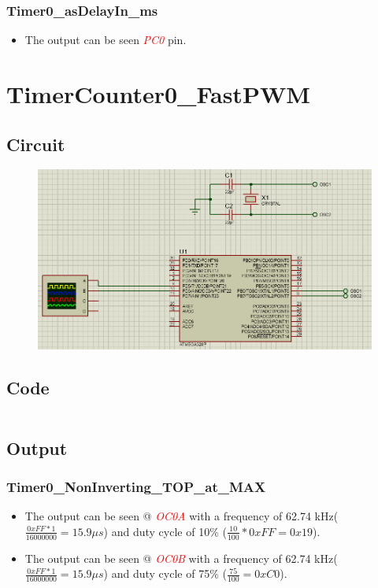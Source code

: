 \documentclass[oneside]{book}
\newcommand{\pinFormat}[1]{\emph{\textcolor{red}{#1}}}
\begin{document}
\subsubsection{Timer0\_asDelayIn\_ms}
\begin{itemize}
    \item The output can be seen \pinFormat{PC0} pin.
\end{itemize}


\section{TimerCounter0\_FastPWM}
\subsection{Circuit}
\begin{figure}[H]
    \centering
    \includegraphics[height=0.2\textheight]{TimerCounter0_FastPWM.png}
\end{figure}
\subsection{Code}
\inputminted[breaklines, bgcolor=black]{c}{./programFiles/TimerCounter0_FastPWM.c}
\subsection{Output}
\subsubsection{Timer0\_NonInverting\_TOP\_at\_MAX}
\begin{itemize}
    \item The output can be seen @ \pinFormat{OC0A} with a frequency of 62.74 kHz($\frac{0xFF * 1}{16000000} = 15.9\mu s$) and duty cycle of 10\% ($\frac{10}{100} * 0xFF = 0x19$).
    \item The output can be seen @ \pinFormat{OC0B} with a frequency of 62.74 kHz($\frac{0xFF * 1}{16000000} = 15.9\mu s$) and duty cycle of 75\% ($\frac{75}{100} = 0xC0$).
\end{itemize}
\end{document}
